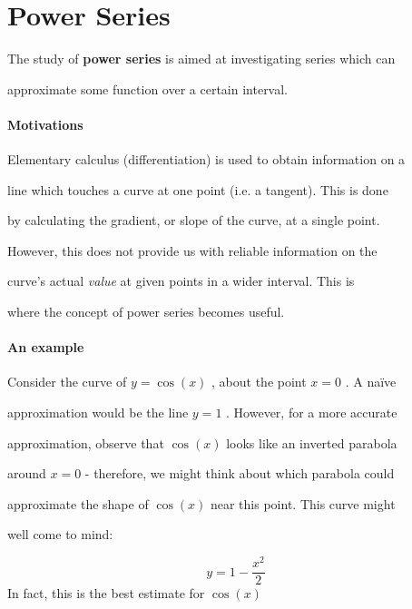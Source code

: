 \section{Power Series}
\label{sec:power-series}

The study of \textbf{power series} is aimed at investigating series which can

approximate some function over a certain interval.



\paragraph{Motivations}



Elementary calculus (differentiation) is used to obtain information on a

line which touches a curve at one point (i.e. a tangent). This is done

by calculating the gradient, or slope of the curve, at a single point.

However, this does not provide us with reliable information on the

curve's actual \textit{value} at given points in a wider interval. This is

where the concept of power series becomes useful.



\paragraph{An example}



Consider the curve of $y=\cos(x)$ , about the point $x=0$ . A naïve

approximation would be the line $y=1$ . However, for a more accurate

approximation, observe that $\cos(x)$ looks like an inverted parabola

around $x=0$ - therefore, we might think about which parabola could

approximate the shape of $\cos(x)$ near this point. This curve might

well come to mind:



$$y=1-\frac{x^2}{2}$$ In fact, this is the best estimate for $\cos(x)$

